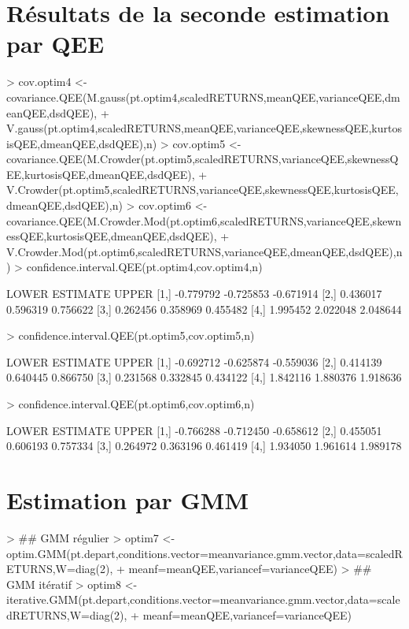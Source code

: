 \documentclass{report}
\begin{document}
\section{Résultats de la seconde estimation par QEE}

\begin{Schunk}
\begin{Sinput}
> 	cov.optim4 <- covariance.QEE(M.gauss(pt.optim4,scaledRETURNS,meanQEE,varianceQEE,dmeanQEE,dsdQEE),
+ 			V.gauss(pt.optim4,scaledRETURNS,meanQEE,varianceQEE,skewnessQEE,kurtosisQEE,dmeanQEE,dsdQEE),n)
> 	cov.optim5 <- covariance.QEE(M.Crowder(pt.optim5,scaledRETURNS,varianceQEE,skewnessQEE,kurtosisQEE,dmeanQEE,dsdQEE),
+ 			V.Crowder(pt.optim5,scaledRETURNS,varianceQEE,skewnessQEE,kurtosisQEE,dmeanQEE,dsdQEE),n)
> 	cov.optim6 <- covariance.QEE(M.Crowder.Mod(pt.optim6,scaledRETURNS,varianceQEE,skewnessQEE,kurtosisQEE,dmeanQEE,dsdQEE),
+ 			V.Crowder.Mod(pt.optim6,scaledRETURNS,varianceQEE,dmeanQEE,dsdQEE),n)
> 	confidence.interval.QEE(pt.optim4,cov.optim4,n)
\end{Sinput}
\begin{Soutput}
         LOWER  ESTIMATE     UPPER
[1,] -0.779792 -0.725853 -0.671914
[2,]  0.436017  0.596319  0.756622
[3,]  0.262456  0.358969  0.455482
[4,]  1.995452  2.022048  2.048644
\end{Soutput}
\begin{Sinput}
> 	confidence.interval.QEE(pt.optim5,cov.optim5,n)
\end{Sinput}
\begin{Soutput}
         LOWER  ESTIMATE     UPPER
[1,] -0.692712 -0.625874 -0.559036
[2,]  0.414139  0.640445  0.866750
[3,]  0.231568  0.332845  0.434122
[4,]  1.842116  1.880376  1.918636
\end{Soutput}
\begin{Sinput}
> 	confidence.interval.QEE(pt.optim6,cov.optim6,n)
\end{Sinput}
\begin{Soutput}
         LOWER  ESTIMATE     UPPER
[1,] -0.766288 -0.712450 -0.658612
[2,]  0.455051  0.606193  0.757334
[3,]  0.264972  0.363196  0.461419
[4,]  1.934050  1.961614  1.989178
\end{Soutput}
\end{Schunk}

\section{Estimation par GMM}

\begin{Schunk}
\begin{Sinput}
> 	## GMM régulier
> 	optim7 <- optim.GMM(pt.depart,conditions.vector=meanvariance.gmm.vector,data=scaledRETURNS,W=diag(2),
+ 			meanf=meanQEE,variancef=varianceQEE)
> 	## GMM itératif
> 	optim8 <- iterative.GMM(pt.depart,conditions.vector=meanvariance.gmm.vector,data=scaledRETURNS,W=diag(2),
+ 			meanf=meanQEE,variancef=varianceQEE)
\end{Sinput}
\end{Schunk}
\end{document}

